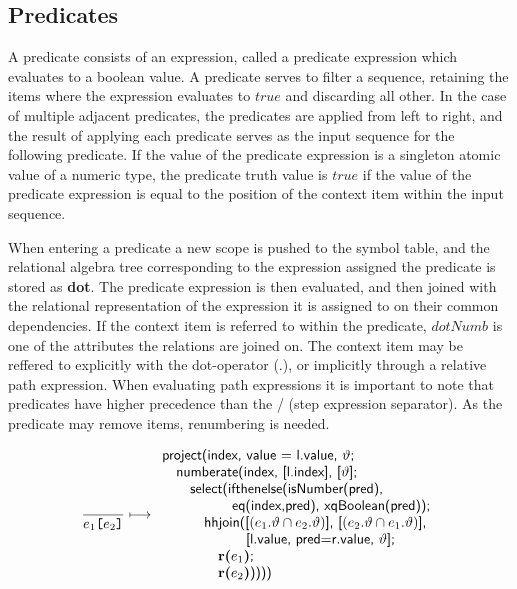 \subsection{Predicates}
\label{sect:trans:TD:predicates}
A predicate consists of an expression, called a predicate expression which evaluates to a boolean value. A
predicate serves to filter a sequence, retaining the items where the expression evaluates to $true$ and discarding
all other. In the case of multiple adjacent predicates, the predicates are applied from left to right, and the
result of applying each predicate serves as the input sequence for the following predicate. If the value of the
predicate expression is a singleton atomic value of a numeric type, the predicate truth value is $true$ if the
value of the predicate expression is equal to the position of the context item within the input sequence.

When entering a predicate a new scope is pushed to the symbol table, and the relational algebra tree corresponding
to the expression assigned the predicate is stored as \textbf{dot}. The predicate expression is then evaluated,
and then joined with the relational representation of the expression it is assigned to on their common
dependencies. If the context item is referred to within the predicate, $dotNumb$ is one of the attributes the
relations are joined on. The context item may be reffered to explicitly with the dot-operator (.), or implicitly
through a relative path expression. When evaluating path expressions it is important to note that predicates have
higher precedence than the / (step expression separator). As the predicate may remove items, renumbering is
needed. 

\begin{equation}
\frac{}{e_1\mbox{\texttt{[}}e_2\mbox{\texttt{]}}}\longmapsto
\begin{array}{l}
\mbox{\textsf{project(index, value = l.value, }}\vartheta\mbox{\textsf{;}} \\ \quad
\mbox{\textsf{numberate(index, [l.index], [}}\vartheta\mbox{\textsf{];}} \\ \quad\quad
\mbox{\textsf{select(ifthenelse(isNumber(pred),}} \\\quad\quad\quad\quad\quad
\mbox{\textsf{eq(index,pred), xqBoolean(pred));}} \\\quad\quad\quad
\mbox{\textsf{hhjoin([}}(e_1.\vartheta\cap e_2.\vartheta)\mbox{\textsf{], [}}(e_2.\vartheta\cap e_1.\vartheta)\mbox{\textsf{],}} 
\\ \quad\quad\quad \quad \quad \quad\mbox{\textsf{[l.value, pred=r.value, }}\vartheta\mbox{\textsf{];}}
\\\quad\quad\quad\quad
 \mbox{\textbf{r(}}e_1\mbox{\textbf{)}\textsf{;}} \\\quad\quad\quad\quad
\mbox{\textbf{r(}}e_2\mbox{\textbf{)}\textsf{))))}} \\
\end{array}
\label{rule:trans:TD:predicate}
\end{equation}


